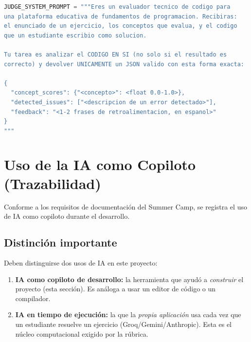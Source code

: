 \documentclass[11pt,letterpaper]{article}
\begin{document}
\begin{lstlisting}[language=Python, caption={Prompt de sistema del evaluador (src/llm\_judge.py)}]
JUDGE_SYSTEM_PROMPT = """Eres un evaluador tecnico de codigo para
una plataforma educativa de fundamentos de programacion. Recibiras:
el enunciado de un ejercicio, los conceptos que evalua, y el codigo
que un estudiante escribio como solucion.

Tu tarea es analizar el CODIGO EN SI (no solo si el resultado es
correcto) y devolver UNICAMENTE un JSON valido con esta forma exacta:

{
  "concept_scores": {"<concepto>": <float 0.0-1.0>},
  "detected_issues": ["<descripcion de un error detectado>"],
  "feedback": "<1-2 frases de retroalimentacion, en espanol>"
}
"""
\end{lstlisting}

\section{Uso de la IA como Copiloto (Trazabilidad)}

Conforme a los requisitos de documentación del Summer Camp, se
registra el uso de IA como copiloto durante el desarrollo.

\subsection{Distinción importante}
Deben distinguirse dos usos de IA en este proyecto:
\begin{enumerate}[leftmargin=*]
  \item \textbf{IA como copiloto de desarrollo:} la herramienta que
  ayudó a \textit{construir} el proyecto (esta sección). Es análoga a
  usar un editor de código o un compilador.
  \item \textbf{IA en tiempo de ejecución:} la que la \textit{propia
  aplicación} usa cada vez que un estudiante resuelve un ejercicio
  (Groq/Gemini/Anthropic). Esta es el núcleo computacional exigido por
  la rúbrica.
\end{enumerate}
\end{document}
